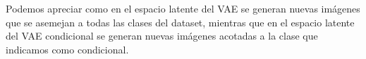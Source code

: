 \documentclass[11pt]{article}
\begin{document}
Podemos apreciar como en el espacio latente del VAE se generan nuevas imágenes que se asemejan a todas las clases del dataset, mientras que en el espacio latente del VAE condicional se generan nuevas imágenes acotadas a la clase que indicamos como condicional.

\newpage



\end{document}
